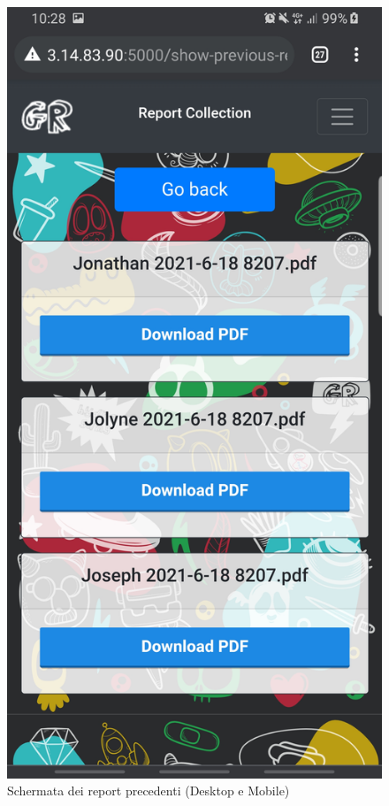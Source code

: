 \begin{figure}[H]
\begin{minipage}[b]{0.19\textwidth}
    \includegraphics[width=\textwidth]{img/screen/M reports.jpg}
  \end{minipage}
    \caption{Schermata dei report precedenti (Desktop e Mobile)}
\end{figure}

